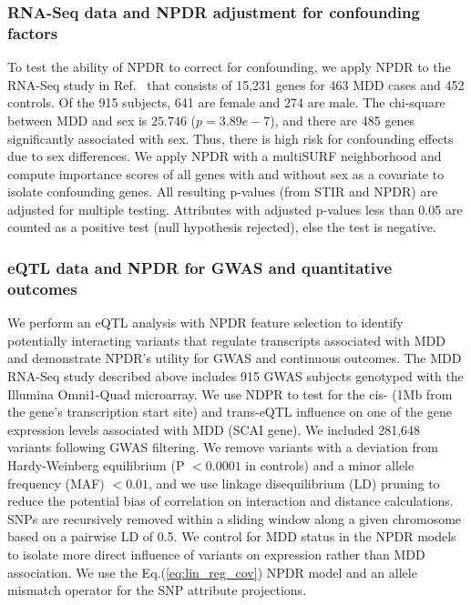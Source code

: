 \documentclass{bioinfo}
\begin{document}
\subsubsection{RNA-Seq data and NPDR adjustment for confounding factors}
To test the ability of NPDR to correct for confounding, we apply NPDR to the RNA-Seq study in Ref.~\citep{mostafavi14} that consists of 15,231 genes for 463 MDD cases and 452 controls.
Of the 915 subjects, 641 are female and 274 are male.
The chi-square between MDD and sex is $25.746$ ($p=3.89e-7$), and there are 485 genes significantly associated with sex.
Thus, there is high risk for confounding effects due to sex differences.
We apply NPDR with a multiSURF neighborhood and compute importance scores of all genes with and without sex as a covariate to isolate confounding genes. All resulting p-values (from STIR and NPDR) are adjusted for multiple testing.
Attributes with adjusted p-values less than 0.05 are counted as a positive test (null hypothesis rejected), else the test is negative.

\subsubsection{eQTL data and NPDR for GWAS and quantitative outcomes}
We perform an eQTL analysis with NPDR feature selection to identify potentially interacting variants that regulate transcripts associated with MDD and demonstrate NPDR's utility for GWAS and continuous outcomes.
The MDD RNA-Seq study described above includes 915 GWAS subjects genotyped with the Illumina Omni1-Quad microarray\citep{mostafavi14}.
We use NDPR to test for the cis- (1Mb from the gene's transcription start site) and trans-eQTL influence on one of the gene expression levels associated with MDD (SCAI gene).
We included 281,648 variants following GWAS filtering.
We remove variants with a deviation from Hardy-Weinberg equilibrium (P $<0.0001$ in controls) and a minor allele frequency (MAF) $<0.01$, and we use linkage disequilibrium (LD) pruning to reduce the potential bias of correlation on interaction and distance calculations.
SNPs are recursively removed within a sliding window along a given chromosome based on a pairwise LD of 0.5.
We control for MDD status in the NPDR models to isolate more direct influence of variants on expression rather than MDD association. We use the Eq.(\ref{eq:lin_reg_cov}) NPDR model and an allele mismatch operator for the SNP attribute projections\citep{titv}. 
\end{document}
